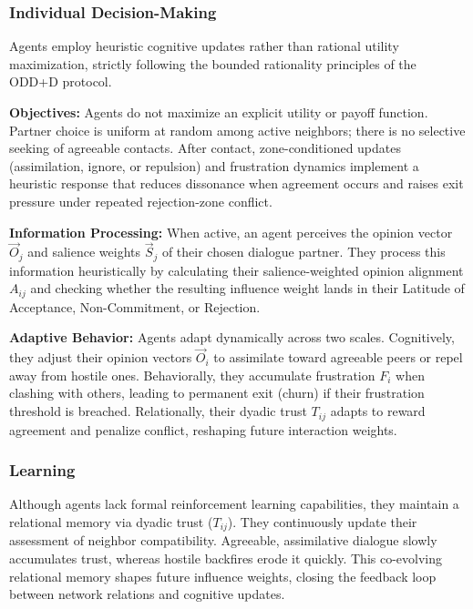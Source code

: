 \subsubsection{Individual Decision-Making}
Agents employ heuristic cognitive updates rather than rational utility maximization, strictly following the bounded rationality principles of the ODD+D protocol.
\begin{itemize*}
    \item \textbf{Objectives:} Agents do not maximize an explicit utility or payoff function. Partner choice is uniform at random among active neighbors; there is no selective seeking of agreeable contacts. After contact, zone-conditioned updates (assimilation, ignore, or repulsion) and frustration dynamics implement a heuristic response that reduces dissonance when agreement occurs and raises exit pressure under repeated rejection-zone conflict.
    \item \textbf{Information Processing:} When active, an agent perceives the opinion vector $\vec{O}_j$ and salience weights $\vec{S}_j$ of their chosen dialogue partner. They process this information heuristically by calculating their salience-weighted opinion alignment $A_{ij}$ and checking whether the resulting influence weight lands in their Latitude of Acceptance, Non-Commitment, or Rejection.
    \item \textbf{Adaptive Behavior:} Agents adapt dynamically across two scales. Cognitively, they adjust their opinion vectors $\vec{O}_i$ to assimilate toward agreeable peers or repel away from hostile ones. Behaviorally, they accumulate frustration $F_i$ when clashing with others, leading to permanent exit (churn) if their frustration threshold is breached. Relationally, their dyadic trust $T_{ij}$ adapts to reward agreement and penalize conflict, reshaping future interaction weights.
\end{itemize*}

\subsubsection{Learning}
Although agents lack formal reinforcement learning capabilities, they maintain a relational memory via dyadic trust ($T_{ij}$). They continuously update their assessment of neighbor compatibility. Agreeable, assimilative dialogue slowly accumulates trust, whereas hostile backfires erode it quickly. This co-evolving relational memory shapes future influence weights, closing the feedback loop between network relations and cognitive updates.

